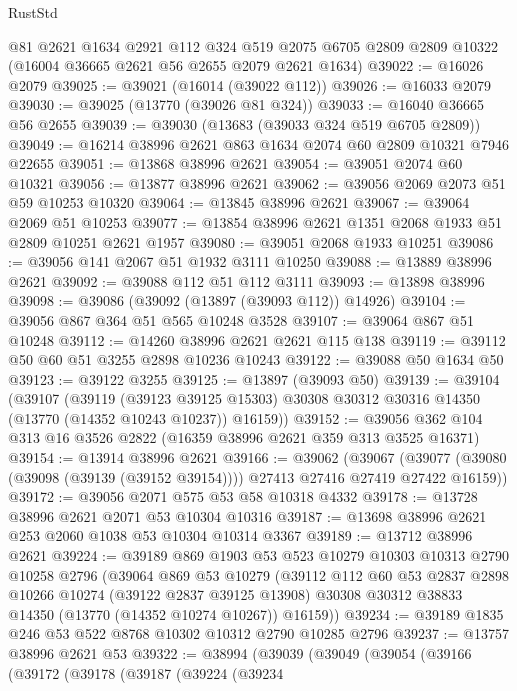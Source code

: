 \begin{lexlean}{RustStd}
\begin{coremodule}
    @81
    @2621
    @1634
    @2921
    @112
    @324
    @519
    @2075
    @6705
    @2809
    @2809
    @10322
    (@16004 @36665 @2621 @56 @2655 @2079 @2621 @1634)
@39022 := @16026 @2079
@39025 := @39021 (@16014 (@39022 @112))
@39026 := @16033 @2079
@39030 := @39025 (@13770 (@39026 @81 @324))
@39033 := @16040 @36665 @56 @2655
@39039 := @39030 (@13683 (@39033 @324 @519 @6705 @2809))
@39049 := @16214 @38996 @2621 @863 @1634 @2074 @60 @2809 @10321 @7946 @22655
@39051 := @13868 @38996 @2621
@39054 := @39051 @2074 @60 @10321
@39056 := @13877 @38996 @2621
@39062 := @39056 @2069 @2073 @51 @59 @10253 @10320
@39064 := @13845 @38996 @2621
@39067 := @39064 @2069 @51 @10253
@39077 := @13854 @38996 @2621 @1351 @2068 @1933 @51 @2809 @10251 @2621 @1957
@39080 := @39051 @2068 @1933 @10251
@39086 := @39056 @141 @2067 @51 @1932 @3111 @10250
@39088 := @13889 @38996 @2621
@39092 := @39088 @112 @51 @112 @3111
@39093 := @13898 @38996
@39098 := @39086 (@39092 (@13897 (@39093 @112)) @14926)
@39104 := @39056 @867 @364 @51 @565 @10248 @3528
@39107 := @39064 @867 @51 @10248
@39112 := @14260 @38996 @2621 @2621 @115 @138
@39119 := @39112 @50 @60 @51 @3255 @2898 @10236 @10243
@39122 := @39088 @50 @1634 @50
@39123 := @39122 @3255
@39125 := @13897 (@39093 @50)
@39139 := @39104
    (@39107
      (@39119
        (@39123 @39125 @15303)
        @30308
        @30312
        @30316
        @14350
        (@13770 (@14352 @10243 @10237))
        @16159))
@39152 := @39056 @362 @104 @313 @16 @3526 @2822 (@16359 @38996 @2621 @359 @313 @3525 @16371)
@39154 := @13914 @38996 @2621
@39166 := @39062
    (@39067 (@39077 (@39080 (@39098 (@39139 (@39152 @39154)))) @27413 @27416 @27419 @27422 @16159))
@39172 := @39056 @2071 @575 @53 @58 @10318 @4332
@39178 := @13728 @38996 @2621 @2071 @53 @10304 @10316
@39187 := @13698 @38996 @2621 @253 @2060 @1038 @53 @10304 @10314 @3367
@39189 := @13712 @38996 @2621
@39224 := @39189
    @869
    @1903
    @53
    @523
    @10279
    @10303
    @10313
    @2790
    @10258
    @2796
    (@39064
      @869
      @53
      @10279
      (@39112
        @112
        @60
        @53
        @2837
        @2898
        @10266
        @10274
        (@39122 @2837 @39125 @13908)
        @30308
        @30312
        @38833
        @14350
        (@13770 (@14352 @10274 @10267))
        @16159))
@39234 := @39189 @1835 @246 @53 @522 @8768 @10302 @10312 @2790 @10285 @2796
@39237 := @13757 @38996 @2621 @53
@39322 := @38994
    (@39039
      (@39049
        (@39054
          (@39166
            (@39172
              (@39178
                (@39187
                  (@39224
                    (@39234

\end{coremodule}
\end{lexlean}
